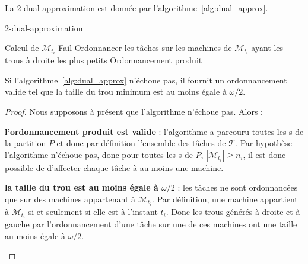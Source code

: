 \documentclass[a4paper,9pt]{article}
\begin{document}
La $2$-dual-approximation est donnée par l'algorithme~\ref{alg:dual_approx}.

\begin{algorithm}
    \caption{\unitfisched{} $2$-dual-approximation}
    \label{alg:dual_approx}
    \begin{algorithmic}[1]
            \State Calcul de $\mathcal{M}_{t_i}$
                \State \Return Fail
            \EndIf
            \State Ordonnancer les tâches sur les machines de $\mathcal{M}_{t_i}$ ayant les trous à
            droite les plus petits
        \EndFor
        \Return Ordonnancement produit
    \end{algorithmic}
\end{algorithm}

\begin{nthrm}
    Si l'algorithme~\ref{alg:dual_approx} n'échoue pas, il fournit un ordonnancement valide tel que
    la taille du trou minimum est au moins égale à $\omega / 2$.
\end{nthrm}

\begin{proof}
    Nous supposons à présent que l'algorithme n'échoue pas. Alors :
    \begin{bitemize}
        \item\textbf{l'ordonnancement produit est valide} : l'algorithme a parcouru toutes les
            \tphase{}s de la partition $P$ et donc par définition l'ensemble des tâches de
            $\mathcal{T}$. Par hypothèse l'algorithme n'échoue pas, donc pour toutes les
            \tphase{}s de $P$, $|\mathcal{M}_{t_i}| \geq n_i$, il est donc possible de d'affecter
            chaque tâche à au moins une machine.
        \item\textbf{la taille du trou est au moins égale à $\omega / 2$} : les tâches ne sont ordonnancées
            que sur des machines appartenant à $\mathcal{M}_{t_i}$. Par définition, une machine
            appartient à $\mathcal{M}_{t_i}$ si et seulement si elle est
             à l'instant $t_i$. Donc les trous générés à droite et à gauche
            par l'ordonnancement d'une tâche sur une de ces machines ont une taille au moins égale à
            $\omega / 2$.
    \end{bitemize}
\end{proof}
\end{document}
